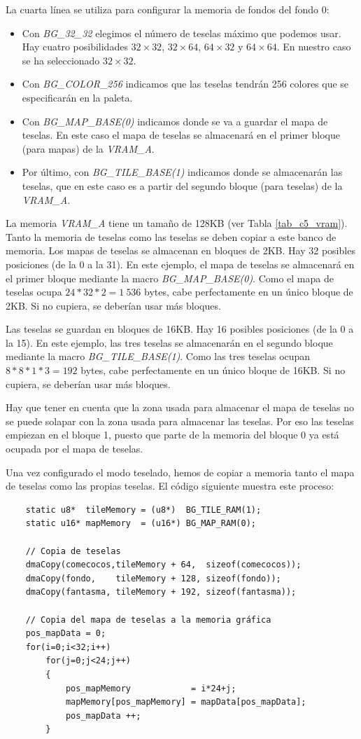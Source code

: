 La cuarta línea se utiliza para configurar la memoria de fondos del fondo 0:
\begin{itemize}
	\item Con \textit{BG\_32\_32} elegimos el número de teselas máximo que podemos usar. Hay cuatro posibilidades $32\times32$, $32\times64$, $64\times32$ y $64\times64$. En nuestro caso se ha seleccionado $32\times32$.
	\item Con \textit{BG\_COLOR\_256} indicamos que las teselas tendrán 256 colores que se especificarán en la paleta.
	\item Con \textit{ BG\_MAP\_BASE(0)} indicamos donde se va a guardar el mapa de teselas. En este caso el mapa de teselas se almacenará en el primer bloque (para mapas) de la \textit{VRAM\_A}.
	\item Por último, con \textit{BG\_TILE\_BASE(1)} indicamos donde se almacenarán las teselas, que en este caso es a partir del segundo bloque (para teselas) de la \textit{VRAM\_A}.
\end{itemize}
  

La memoria \textit{VRAM\_A} tiene un tamaño de 128KB (ver Tabla \ref{tab_c5_vram}). Tanto la memoria de teselas como las teselas se deben copiar a este banco de memoria. Los mapas de teselas se almacenan en bloques de 2KB. Hay 32 posibles posiciones (de la 0 a la 31). En este ejemplo, el mapa de teselas se almacenará en el primer bloque mediante la macro \textit{BG\_MAP\_BASE(0)}. Como el mapa de teselas ocupa $24*32*2 = 1\ 536$ bytes, cabe perfectamente en un único bloque de 2KB. Si no cupiera, se deberían usar más bloques.

Las teselas se guardan en bloques de 16KB. Hay 16 posibles posiciones (de la 0 a la 15). En este ejemplo, las tres teselas se almacenarán en el segundo bloque mediante la macro \textit{BG\_TILE\_BASE(1)}. Como las tres teselas ocupan $8*8*1*3 = 192$ bytes, cabe perfectamente en un único bloque de 16KB. Si no cupiera, se deberían usar más bloques. 

Hay que tener en cuenta que la zona usada para almacenar el mapa de teselas no se puede solapar con la zona usada para almacenar las teselas. Por eso las teselas empiezan en el bloque 1, puesto que parte de la memoria del bloque 0 ya está ocupada por el mapa de teselas.

Una vez configurado el modo teselado, hemos de copiar a memoria tanto el mapa de teselas como las propias teselas. El código siguiente muestra este proceso:

\begin{lstlisting}
	static u8*  tileMemory = (u8*)  BG_TILE_RAM(1);
	static u16* mapMemory  = (u16*) BG_MAP_RAM(0);

	// Copia de teselas
	dmaCopy(comecocos,tileMemory + 64,  sizeof(comecocos));
	dmaCopy(fondo,    tileMemory + 128, sizeof(fondo));
	dmaCopy(fantasma, tileMemory + 192, sizeof(fantasma));

	// Copia del mapa de teselas a la memoria gráfica
	pos_mapData = 0;
	for(i=0;i<32;i++)
		for(j=0;j<24;j++)
		{
			pos_mapMemory            = i*24+j;
			mapMemory[pos_mapMemory] = mapData[pos_mapData];
			pos_mapData ++;
		}
\end{lstlisting}

